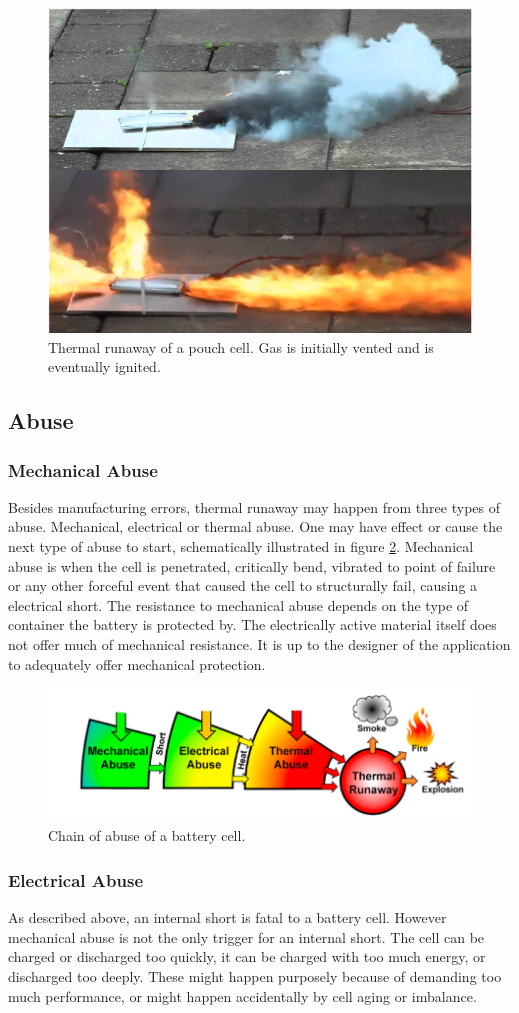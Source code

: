 \begin{figure} [H]
	\centering
	\includegraphics[width=0.4\linewidth]{Figures/pouch_failure.png}
	\caption{Thermal runaway of a pouch cell. Gas is initially vented and is eventually ignited.}
   \label{Fig:Thermal_Runaway}
\end{figure}

\subsection{Abuse}
\subsubsection{Mechanical Abuse}
Besides manufacturing errors, thermal runaway may happen from three types of abuse. Mechanical, electrical or thermal abuse. One may have effect or cause the next type of abuse to start, schematically illustrated in figure \ref{Fig:Abuse_Chain}. Mechanical abuse is when the cell is penetrated, critically bend, vibrated to point of failure or any other forceful event that caused the cell to structurally fail, causing a electrical short. The resistance to mechanical abuse depends on the type of container the battery is protected by. The electrically active material itself does not offer much of mechanical resistance. It is up to the designer of the application to adequately offer mechanical protection.
\begin{figure} [H]
	\centering
	\includegraphics[width=0.6\linewidth]{Figures/abuse.png}
	\caption{Chain of abuse of a battery cell.}
   \label{Fig:Abuse_Chain}
\end{figure}
\subsubsection{Electrical Abuse}
\label{Sub:Electrical_Stability}
As described above, an internal short is fatal to a battery cell. However mechanical abuse is not the only trigger for an internal short. The cell can be charged or discharged too quickly, it can be charged with too much energy, or discharged too deeply. These might happen purposely because of demanding too much performance, or might happen accidentally by cell aging or imbalance.

